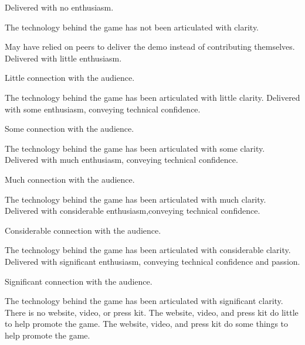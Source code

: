 \documentclass{../../fal_assignment}
\begin{document}
\begin{markingrubric}
%
        \grade\fail Delivered with no enthusiasm. 
           \par The technology behind the game has not been articulated with clarity.
           \par May have relied on peers to deliver the demo instead of contributing themselves.
        \grade Delivered with little enthusiasm. 
            \par Little connection with the audience.
            \par The technology behind the game has been articulated with little clarity.
        \grade Delivered with some enthusiasm, conveying technical confidence. 
            \par Some connection with the audience.
            \par The technology behind the game has been articulated with some clarity.
        \grade Delivered with much enthusiasm, conveying technical confidence. 
            \par Much connection with the audience.
            \par The technology behind the game has been articulated with much clarity.
        \grade Delivered with considerable enthusiasm,conveying technical confidence. 
            \par Considerable connection with the audience.
            \par The technology behind the game has been articulated with considerable clarity.
        \grade Delivered with significant enthusiasm, conveying technical confidence and passion.
            \par Significant connection with the audience.
            \par The technology behind the game has been articulated with significant clarity.
%
        \grade\fail There is no website, video, or press kit. 
        \grade The website, video, and press kit do little to help promote the game.
        \grade The website, video, and press kit do some things to help promote the game.

\end{markingrubric}
\end{document}
